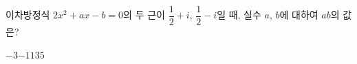 이차방정식 $2x^2+ax-b=0$의 두 근이 $\dfrac{1}{2}+i$, $\dfrac{1}{2}-i$일 때, 실수 $a$, $b$에 대하여 $ab$의 값은?
\begin{choices32}{$-3$}{$-1$}{$1$}{$3$}{$5$}\end{choices32}
